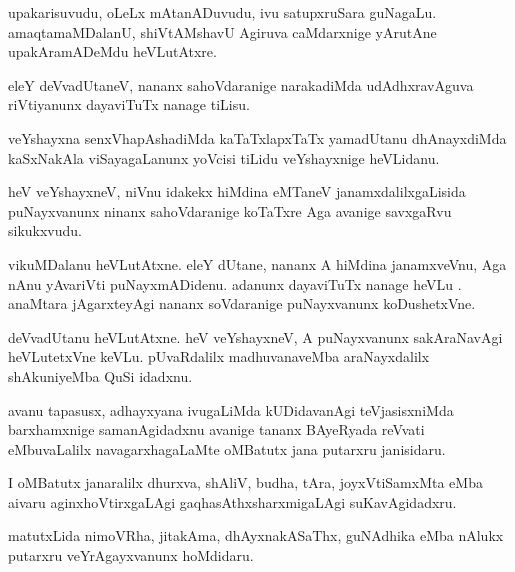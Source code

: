 \documentclass{article}
\begin{document}
\begin{mn}
upakarisuvudu, oLeLx mAtanADuvudu, ivu satupxruSara guNagaLu. amaqtamaMDalanU, shiVtAMshavU Agiruva 
caMdarxnige yArutAne upakAramADeMdu heVLutAtxre.
\end{mn}

\begin{mn}
eleY deVvadUtaneV, nananx sahoVdaranige narakadiMda udAdhxravAguva riVtiyanunx dayaviTuTx nanage 
tiLisu.
\end{mn}

\begin{mn}
veYshayxna senxVhapAshadiMda kaTaTxlapxTaTx yamadUtanu dhAnayxdiMda kaSxNakAla viSayagaLanunx 
yoVcisi tiLidu veYshayxnige heVLidanu.
\end{mn}

\begin{mn}
heV veYshayxneV, niVnu idakekx hiMdina eMTaneV janamxdalilxgaLisida puNayxvanunx ninanx 
sahoVdaranige koTaTxre Aga avanige savxgaRvu sikukxvudu.
\end{mn}

\begin{mn}
vikuMDalanu heVLutAtxne. eleY dUtane, nananx A hiMdina janamxveVnu, Aga nAnu yAvariVti 
puNayxmADidenu. adanunx dayaviTuTx nanage heVLu . anaMtara jAgarxteyAgi nananx soVdaranige 
puNayxvanunx koDushetxVne.
\end{mn}

\begin{mn}
deVvadUtanu heVLutAtxne. heV veYshayxneV, A puNayxvanunx sakAraNavAgi heVLutetxVne keVLu. 
pUvaRdalilx madhuvanaveMba araNayxdalilx shAkuniyeMba QuSi idadxnu.
\end{mn}

\begin{mn}
avanu tapasusx, adhayxyana ivugaLiMda kUDidavanAgi teVjasisxniMda barxhamxnige samanAgidadxnu 
avanige tananx  BAyeRyada reVvati eMbuvaLalilx navagarxhagaLaMte oMBatutx jana putarxru janisidaru.
\end{mn}

\begin{mn}
I oMBatutx janaralilx dhurxva, shAliV, budha, tAra, joyxVtiSamxMta eMba aivaru aginxhoVtirxgaLAgi 
gaqhasAthxsharxmigaLAgi suKavAgidadxru.
\end{mn}

\begin{mn}
matutxLida nimoVRha, jitakAma, dhAyxnakASaThx, guNAdhika eMba nAlukx putarxru veYrAgayxvanunx 
hoMdidaru.
\end{mn}
\end{document}
